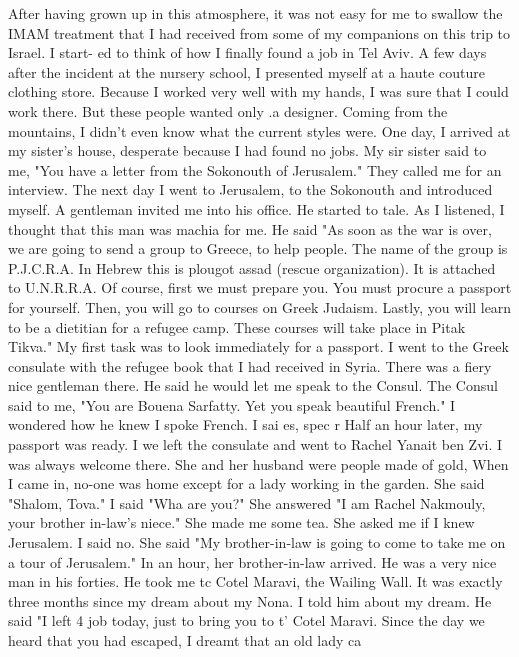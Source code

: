 {{After having grown up in this atmosphere, it was not easy for me to swallow the IMAM 
treatment that I had received from some of my companions on this trip to Israel.
I start-
ed to think of how I finally found a job in Tel Aviv.
A few days after the incident at the nursery school, I presented myself at a haute 
couture clothing store.
Because I worked very well with my hands, I was sure that I 
could work there.
But these people wanted only .a designer.
Coming from the mountains, 
I didn't even know what the current styles were.
One day, I arrived at my sister's house, desperate because I had found no jobs.
My sir 
sister said to me, "You have a letter from the Sokonouth of Jerusalem."
They called me 
for an interview.
The next day I went to Jerusalem, to the Sokonouth and introduced 
myself.
A gentleman invited me into his office.
He started to tale.
As I listened, I 
thought that this man was machia for me.
He said "As soon as the war is over, we are 
going to send a group to Greece, to help people.
The name of the group is P.J.C.R.A.
In Hebrew this is plougot assad (rescue organization).
It is attached to U.N.R.R.A.
Of course, first we must prepare you.
You must procure a passport for yourself.
Then, 
you will go to courses on Greek Judaism.
Lastly, you will learn to be a dietitian for 
a refugee camp.
These courses will take place in Pitak Tikva."
My first task was to look immediately for a passport.
I went to the Greek consulate 
with the refugee book that I had received in Syria.
There was a fiery nice gentleman there.
He said he would let me speak to the Consul.
The Consul said to me, "You are Bouena Sarfatty.
Yet you speak beautiful French."
I wondered how he knew I spoke French.
I sai es, spec r 
Half an hour later, my passport was ready.
I we left the consulate and went to Rachel 
Yanait ben Zvi.
I was always welcome there.
She and her husband were people made of 
gold, 
When I came in, no-one was home except for a lady working in the garden.
She said 
"Shalom, Tova."
I said "Wha are you?"
She answered "I am Rachel Nakmouly, your brother 
in-law's niece."
She made me some tea.
She asked me if I knew Jerusalem.
I said no.
She said "My brother-in-law is going to come to take me on a tour of Jerusalem."
In an 
hour, her brother-in-law arrived.
He was a very nice man in his forties.
He took me tc 
Cotel Maravi, the Wailing Wall.
It was exactly three months since my dream about my 
Nona.
I told him about my dream.
He said "I left 4 job today, just to bring you to t' 
Cotel Maravi.
Since the day we heard that you had escaped, I dreamt that an old lady ca 
}}
